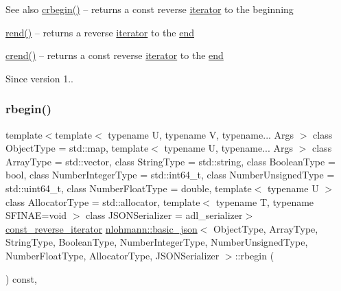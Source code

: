 \begin{DoxySeeAlso}{See also}
\mbox{\hyperlink{classnlohmann_1_1basic__json_a1e0769d22d54573f294da0e5c6abc9de}{crbegin()}} -- returns a const reverse \mbox{\hyperlink{classnlohmann_1_1basic__json_a099316232c76c034030a38faa6e34dca}{iterator}} to the beginning 

\mbox{\hyperlink{classnlohmann_1_1basic__json_ac77aed0925d447744676725ab0b6d535}{rend()}} -- returns a reverse \mbox{\hyperlink{classnlohmann_1_1basic__json_a099316232c76c034030a38faa6e34dca}{iterator}} to the \mbox{\hyperlink{classnlohmann_1_1basic__json_a13e032a02a7fd8a93fdddc2fcbc4763c}{end}} 

\mbox{\hyperlink{classnlohmann_1_1basic__json_a5795b029dbf28e0cb2c7a439ec5d0a88}{crend()}} -- returns a const reverse \mbox{\hyperlink{classnlohmann_1_1basic__json_a099316232c76c034030a38faa6e34dca}{iterator}} to the \mbox{\hyperlink{classnlohmann_1_1basic__json_a13e032a02a7fd8a93fdddc2fcbc4763c}{end}}
\end{DoxySeeAlso}
\begin{DoxySince}{Since}
version 1.. 
\end{DoxySince}
\mbox{\label{classnlohmann_1_1basic__json_a515e7618392317dbf4b72d3e18bf2ab2}} 
\subsubsection{\texorpdfstring{rbegin()}{rbegin()}\hspace{0.1cm}{\footnotesize\ttfamily [2/2]}}
{\footnotesize\ttfamily template$<$template$<$ typename U, typename V, typename... Args $>$ class Object\+Type = std\+::map, template$<$ typename U, typename... Args $>$ class Array\+Type = std\+::vector, class String\+Type  = std\+::string, class Boolean\+Type  = bool, class Number\+Integer\+Type  = std\+::int64\+\_\+t, class Number\+Unsigned\+Type  = std\+::uint64\+\_\+t, class Number\+Float\+Type  = double, template$<$ typename U $>$ class Allocator\+Type = std\+::allocator, template$<$ typename T, typename S\+F\+I\+N\+A\+E=void $>$ class J\+S\+O\+N\+Serializer = adl\+\_\+serializer$>$ \\
\mbox{\hyperlink{classnlohmann_1_1basic__json_a72be3c24bfa24f0993d6c11af03e7404}{const\+\_\+reverse\+\_\+iterator}} \mbox{\hyperlink{classnlohmann_1_1basic__json}{nlohmann\+::basic\+\_\+json}}$<$ Object\+Type, Array\+Type, String\+Type, Boolean\+Type, Number\+Integer\+Type, Number\+Unsigned\+Type, Number\+Float\+Type, Allocator\+Type, J\+S\+O\+N\+Serializer $>$\+::rbegin (\begin{DoxyParamCaption}{ }\end{DoxyParamCaption}) const\hspace{0.3cm}{\ttfamily [inline]}, {\ttfamily [noexcept]}}



